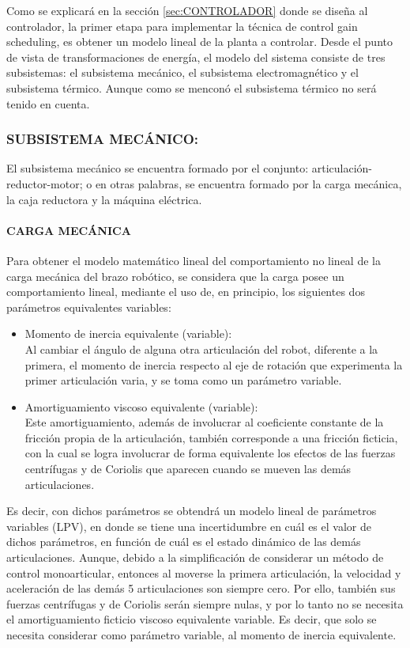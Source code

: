 \documentclass{article}
\begin{document}
\begin{sloppypar}
Como se explicará en la sección \ref{sec:CONTROLADOR} donde se diseña al controlador, la primer etapa para implementar la técnica de control gain scheduling, es obtener un modelo lineal de la planta a controlar.
Desde el punto de vista de transformaciones de energía, el modelo del sistema consiste de tres subsistemas: el subsistema mecánico, el subsistema electromagnético y el subsistema térmico. Aunque como se menconó el subsistema térmico no será tenido en cuenta.

\subsubsection{SUBSISTEMA MECÁNICO:}
\label{sec:SUBSISTEMA MECÁNICO:}

El subsistema mecánico se encuentra formado por el conjunto: articulación-reductor-motor; o en otras palabras, se encuentra formado por la carga mecánica, la caja reductora y la máquina eléctrica.

\paragraph{\textbf{CARGA MECÁNICA}}
\label{sec:CARGA MECÁNICA}
\hfill

\hfill

Para obtener el modelo matemático lineal del comportamiento no lineal de la carga mecánica del brazo robótico, se considera que
la carga posee un comportamiento lineal, mediante el uso de, en principio, los siguientes dos parámetros equivalentes variables:
\begin{itemize}
    \item Momento de inercia equivalente (variable):
    \\ Al cambiar el ángulo de alguna otra articulación del robot, diferente a la primera, el momento de inercia respecto al eje de rotación que experimenta la primer articulación varia, y se toma como un parámetro variable.

    \item Amortiguamiento viscoso equivalente (variable):
    \\ Este amortiguamiento, además de involucrar al coeficiente constante de la fricción  propia de la articulación, también corresponde a una fricción ficticia, con la cual se logra involucrar de forma equivalente los efectos de las fuerzas centrífugas y de Coriolis que aparecen cuando se mueven las demás articulaciones.
\end{itemize}
Es decir, con dichos parámetros se obtendrá un modelo lineal de parámetros variables (LPV), en donde se tiene una incertidumbre en cuál es el valor de dichos parámetros, en función de cuál es el estado dinámico de las demás articulaciones.
Aunque, debido a la simplificación de considerar un método de control monoarticular, entonces al moverse la primera articulación, la velocidad y aceleración de las demás 5 articulaciones son siempre cero. Por ello, también sus fuerzas centrífugas y de Coriolis serán siempre nulas, y por lo tanto no se necesita el amortiguamiento ficticio viscoso equivalente variable. Es decir, que solo se necesita considerar como parámetro variable, al momento de inercia equivalente.


\end{sloppypar}
\end{document}
